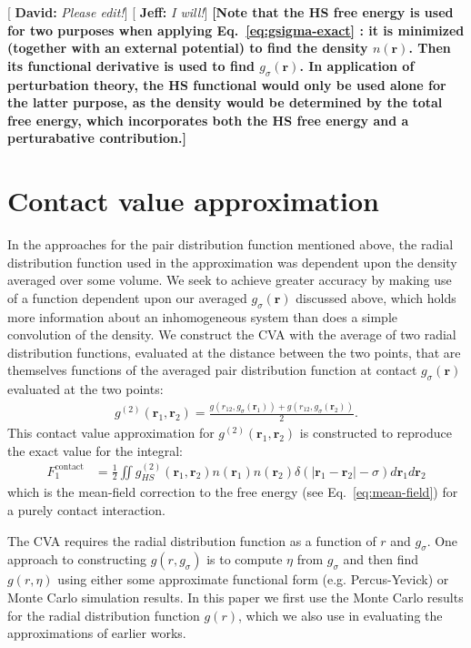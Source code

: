 \documentclass[letterpaper,twocolumn,amsmath,amssymb,pre,aps,10pt]{revtex4-1}
\newcommand{\red}[1]{{\bf \color{red} #1}}
\newcommand{\green}[1]{{\bf \color{green} #1}}
\newcommand{\cyan}[1]{{\bf \color{cyan} #1}}
\newcommand{\rr}{\textbf{r}}
\newcommand{\fixme}[1]{\red{[#1]}}
\newcommand{\davidsays}[1]{{\color{red} [\green{David:} \emph{#1}]}}
\newcommand{\jeffsays}[1]{{\color{red} [\cyan{Jeff:} \emph{#1}]}}
\begin{document}
\davidsays{Please edit!}\jeffsays{I will!}\fixme{Note that the HS free energy is used
  for two purposes when applying Eq.~\ref{eq:gsigma-exact} : it is
  minimized (together with an external potential) to find the density
  $n(\rr)$.  Then its functional derivative is used to find
  $g_\sigma(\rr)$.  In application of perturbation theory, the HS
  functional would only be used alone for the latter purpose, as the
  density would be determined by the total free energy, which
  incorporates both the HS free energy and a perturabative
  contribution.}

\section{Contact value approximation}
In the approaches for the pair distribution function mentioned above,
the radial distribution function used in the approximation
was dependent upon the density averaged over some volume.  We seek to
achieve greater accuracy by making use of a function dependent upon
our averaged $g_{\sigma}(\rr)$ discussed above, which holds more
information about an inhomogeneous system than does a simple
convolution of the density.
%
We construct the CVA with the average of two radial distribution
functions, evaluated at the distance between the two points, that are
themselves functions of the averaged pair distribution function at contact
$g_{\sigma}(\rr)$ evaluated at the two points:
%
\begin{align}
  g^{(2)}(\rr_1,\rr_2) = \frac{g(r_{12}, g_\sigma(\rr_1)) +
    g(r_{12}, g_\sigma(\rr_2))}{2}. \label{eq:g2-our-mean}
\end{align}
This contact value approximation for $g^{(2)}(\rr_1,\rr_2)$ is
constructed to reproduce the exact value for the integral:
\begin{align}
  F_1^{\text{contact}} &= \tfrac12 \iint
  g^{(2)}_{HS}(\rr_1,\rr_2)n(\rr_1)n(\rr_2)\delta(|\rr_1-\rr_2|-\sigma)
  d\rr_1d\rr_2
  \label{eq:mean-field-contact}
\end{align}
which is the mean-field correction to the free energy (see
Eq.~\ref{eq:mean-field}) for a purely contact interaction.

The CVA requires the radial distribution function as a function of $r$
and $g_\sigma$.  One approach to constructing $g(r,g_\sigma)$ is to
compute $\eta$ from $g_\sigma$ and then find $g(r,\eta)$ using either
some approximate functional form (e.g. Percus-Yevick) or Monte Carlo
simulation results.  In this paper we first use the Monte Carlo
results for the radial distribution function $g(r)$, which we also use
in evaluating the approximations of earlier works.
\end{document}
